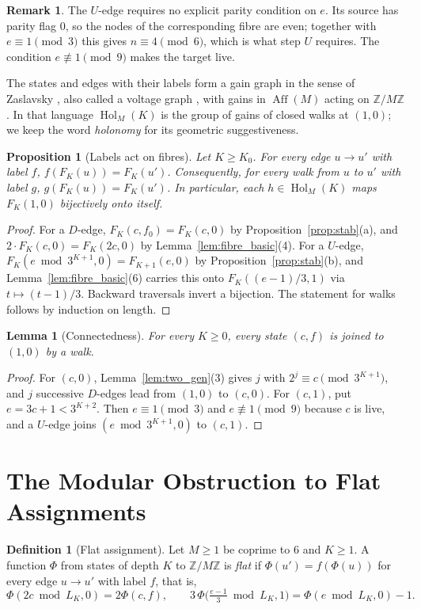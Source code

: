 \documentclass[11pt,reqno,oneside]{amsart}
\theoremstyle{plain}
\newtheorem{proposition}[theorem]{Proposition}
\newtheorem{lemma}[theorem]{Lemma}
\theoremstyle{definition}
\newtheorem{definition}[theorem]{Definition}
\newtheorem{remark}[theorem]{Remark}
\numberwithin{equation}{section}
\newcommand{\Z}{\mathbb{Z}}
\newcommand{\ZM}{\Z/M\Z}
\DeclareMathOperator{\Hol}{Hol}
\DeclareMathOperator{\Aff}{Aff}
\newcommand{\Fib}[3]{F_{#1}(#2,#3)}
\begin{document}
\begin{remark}
The $U$-edge requires no explicit parity condition on $e$. Its source has parity flag $0$, so the nodes of the corresponding fibre are even; together with $e\equiv1\pmod 3$ this gives $n\equiv4\pmod6$, which is what step $U$ requires. The condition $e\not\equiv1\pmod 9$ makes the target live.

The states and edges with their labels form a gain graph in the sense of Zaslavsky \cite{Zaslavsky89}, also called a voltage graph \cite{GrossTucker87}, with gains in $\Aff(M)$ acting on $\ZM$. In that language $\Hol_M(K)$ is the group of gains of closed walks at $(1,0)$; we keep the word \emph{holonomy} for its geometric suggestiveness.
\end{remark}

\begin{proposition}[Labels act on fibres]\label{prop:walk_image}
Let $K\ge K_0$. For every edge $u\to u'$ with label $f$, $f(F_K(u))=F_K(u')$. Consequently, for every walk from $u$ to $u'$ with label $g$, $g(F_K(u))=F_K(u')$. In particular, each $h\in\Hol_M(K)$ maps $\Fib K10$ bijectively onto itself.
\end{proposition}
\begin{proof}
For a $D$-edge, $\Fib Kc{f_0}=\Fib Kc0$ by Proposition~\ref{prop:stab}(a), and $2\cdot\Fib Kc0=\Fib K{2c}0$ by Lemma~\ref{lem:fibre_basic}(4). For a $U$-edge, $\Fib K{e\bmod3^{K+1}}0=\Fib{K+1}e0$ by Proposition~\ref{prop:stab}(b), and Lemma~\ref{lem:fibre_basic}(6) carries this onto $\Fib K{(e-1)/3}1$ via $t\mapsto(t-1)/3$. Backward traversals invert a bijection. The statement for walks follows by induction on length.
\end{proof}

\begin{lemma}[Connectedness]\label{lem:connected}
For every $K\ge0$, every state $(c,f)$ is joined to $(1,0)$ by a walk.
\end{lemma}
\begin{proof}
For $(c,0)$, Lemma~\ref{lem:two_gen}(3) gives $j$ with $2^j\equiv c\pmod{3^{K+1}}$, and $j$ successive $D$-edges lead from $(1,0)$ to $(c,0)$. For $(c,1)$, put $e=3c+1<3^{K+2}$. Then $e\equiv1\pmod3$ and $e\not\equiv1\pmod9$ because $c$ is live, and a $U$-edge joins $(e\bmod3^{K+1},0)$ to $(c,1)$.
\end{proof}

\section{The Modular Obstruction to Flat Assignments}\label{sec:flat}
\begin{definition}[Flat assignment]\label{def:flat}
Let $M\ge1$ be coprime to $6$ and $K\ge1$. A function $\Phi$ from states of depth $K$ to $\ZM$ is \emph{flat} if $\Phi(u')=f(\Phi(u))$ for every edge $u\to u'$ with label $f$, that is,
\begin{equation}\label{eq:flat}
\Phi(2c\bmod L_K,0)=2\Phi(c,f),\qquad 3\,\Phi\bigl(\tfrac{e-1}{3}\bmod L_K,1\bigr)=\Phi(e\bmod L_K,0)-1 .
\end{equation}
\end{definition}
\end{document}
